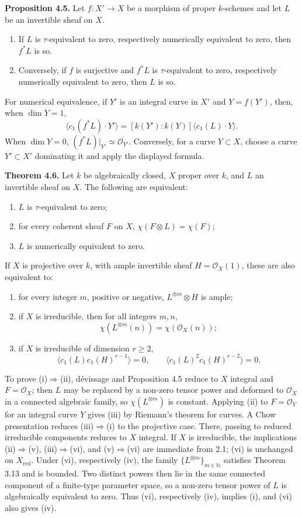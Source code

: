 \documentclass[11pt]{article}
\begin{document}
\textbf{Proposition 4.5.} Let $f:X'\to X$ be a morphism of proper $k$-schemes and let $L$ be an invertible sheaf on $X$.
\begin{enumerate}[label=\roman*)]
\item If $L$ is $\tau$-equivalent to zero, respectively numerically equivalent to zero, then $f^*L$ is so.
\item Conversely, if $f$ is surjective and $f^*L$ is $\tau$-equivalent to zero, respectively numerically equivalent to zero, then $L$ is so.
\end{enumerate}
For numerical equivalence, if $Y'$ is an integral curve in $X'$ and $Y=f(Y')$, then, when $\dim Y=1$,
\[
 \langle c_1(f^*L)\cdot Y'\rangle=[k(Y'):k(Y)]\langle c_1(L)\cdot Y\rangle.
\]
When $\dim Y=0$, $(f^*L)|_{Y'}\simeq\mathcal O_{Y'}$. Conversely, for a curve $Y\subset X$, choose a curve $Y'\subset X'$ dominating it and apply the displayed formula.

\textbf{Theorem 4.6.} Let $k$ be algebraically closed, $X$ proper over $k$, and $L$ an invertible sheaf on $X$. The following are equivalent:
\begin{enumerate}[label=\roman*)]
\item $L$ is $\tau$-equivalent to zero;
\item for every coherent sheaf $F$ on $X$, $\chi(F\otimes L)=\chi(F)$;
\item $L$ is numerically equivalent to zero.
\end{enumerate}
If $X$ is projective over $k$, with ample invertible sheaf $H=\mathcal O_X(1)$, these are also equivalent to:
\begin{enumerate}[label=\roman*),start=4]
\item for every integer $m$, positive or negative, $L^{\otimes m}\otimes H$ is ample;
\item if $X$ is irreducible, then for all integers $m,n$,
\[
 \chi(L^{\otimes m}(n))=\chi(\mathcal O_X(n));
\]
\item if $X$ is irreducible of dimension $r\ge2$,
\[
 \langle c_1(L)c_1(H)^{r-1}\rangle=0,
 \qquad
 \langle c_1(L)^2c_1(H)^{r-2}\rangle=0.
\]
\end{enumerate}

To prove (i)$\Rightarrow$(ii), d\'evissage and Proposition 4.5 reduce to $X$ integral and $F=\mathcal O_X$; then $L$ may be replaced by a non-zero tensor power and deformed to $\mathcal O_X$ in a connected algebraic family, so $\chi(L^{\otimes m})$ is constant. Applying (ii) to $F=\mathcal O_Y$ for an integral curve $Y$ gives (iii) by Riemann's theorem for curves. A Chow presentation reduces (iii)$\Rightarrow$(i) to the projective case. There, passing to reduced irreducible components reduces to $X$ integral. If $X$ is irreducible, the implications (ii)$\Rightarrow$(v), (iii)$\Rightarrow$(vi), and (v)$\Rightarrow$(vi) are immediate from 2.1; (vi) is unchanged on $X_{\mathrm{red}}$. Under (vi), respectively (iv), the family $\{L^{\otimes m}\}_{m\in\mathbb N}$ satisfies Theorem 3.13 and is bounded. Two distinct powers then lie in the same connected component of a finite-type parameter space, so a non-zero tensor power of $L$ is algebraically equivalent to zero. Thus (vi), respectively (iv), implies (i), and (vi) also gives (iv).
\end{document}
